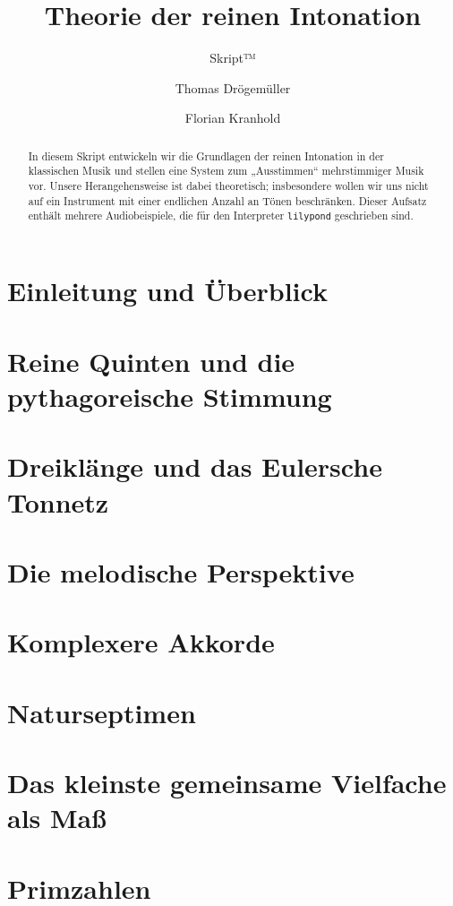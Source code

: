 \documentclass[ngerman,11pt]{scrartcl}
\title     {Theorie der reinen Intonation}
\author    {Thomas Drögemüller\and Florian Kranhold}
\subtitle  {Skript™}
\begin{document}
\maketitle

\begin{abstract}
  In diesem Skript entwickeln wir die Grundlagen der reinen Intonation in der
  klassischen Musik und stellen eine System zum „Ausstimmen“ mehrstimmiger Musik
  vor. Unsere Herangehensweise ist dabei theoretisch; insbesondere wollen wir
  uns nicht auf ein Instrument mit einer endlichen Anzahl an Tönen
  beschränken. Dieser Aufsatz enthält mehrere Audiobeispiele, die für den
  Interpreter \texttt{lilypond} geschrieben sind.
\end{abstract}

\section{Einleitung und Überblick}
\label{sec:int}


\section{Reine Quinten und die pythagoreische Stimmung}
\label{sec:pyth}


\section{Dreiklänge und das Eulersche Tonnetz}
\label{sec:tri}


\section{Die melodische Perspektive}
\label{sec:melody}


\section{Komplexere Akkorde}
\label{sec:quad}


\section{Naturseptimen}
\label{sec:sept}


\appendix
\section{Das kleinste gemeinsame Vielfache als Maß}
\label{sec:kgv}


\section{Primzahlen}
\label{sec:primes}



\printbibliography[heading=bibintoc]
\end{document}

